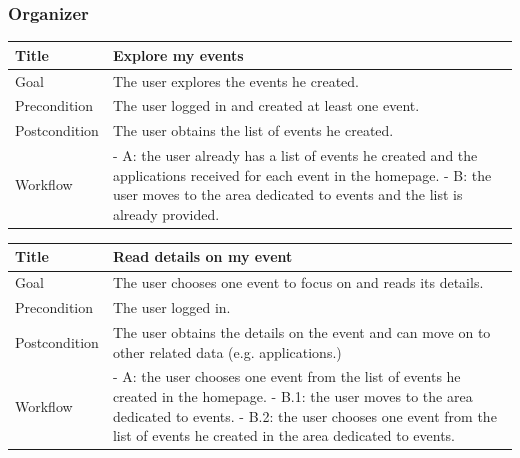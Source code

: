 \documentclass{beamer}
\begin{document}
\begin{frame}
    \frametitle{Organizer}
    \begin{table}
        \tiny
        \begin{tabular}{|p{2cm}|p{6cm}|}
        \hline
        Title & \textbf{Explore my events} \\
        \hline
        Goal & The user explores the events he created. \\
        \hline
        Precondition & The user logged in and created at least one event.\\
        \hline
        Postcondition & The user obtains the list of events he created. \\
        \hline
        Workflow &
        - A: the user already has a list of events he created and the applications received for each event 
        in the homepage. \newline
        - B: the user moves to the area dedicated to events and the list is already provided. \\
        \hline
        \end{tabular}
\end{table}

\begin{table}
    \tiny
    \begin{tabular}{|p{2cm}|p{6cm}|}
    \hline
    Title & \textbf{Read details on my event} \\
    \hline
    Goal & The user chooses one event to focus on and reads its details. \\
    \hline
    Precondition & The user logged in. \\
    \hline
    Postcondition & The user obtains the details on the event and 
    can move on to other related data (e.g. applications.) \\
    \hline
    Workflow &
    - A: the user chooses one event from the list of events he created in the homepage. \newline
    - B.1: the user moves to the area dedicated to events. \newline
    - B.2: the user chooses one event from the list of events he created in the area dedicated to events. \\
    \hline
    \end{tabular}
\end{table}

\end{frame}
\end{document}
